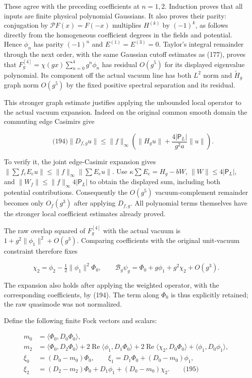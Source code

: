 These agree with the preceding coefficients at \(n=1,2\). Induction
proves that all inputs are finite physical polynomial Gaussians. It also
proves their parity: conjugation by \(\mathcal P F(x)=F(-x)\) multiplies
\(H^{(k)}\) by \((-1)^k\), as follows directly from the homogeneous
coefficient degrees in the fields and potential. Hence \(\phi_n\) has
parity \((-1)^n\) and \(E^{(1)}=E^{(3)}=0\). Taylor's integral remainder
through the next order, with the same Gaussian cutoff estimates as
(177), proves that \(F_g^{[4]}=\chi(gx)\sum_{n=0}^4g^n\phi_n\) has
residual \(O(g^5)\) for its displayed eigenvalue polynomial. Its
component off the actual vacuum line has both \(L^2\) norm and
\(\widetilde H_g\) graph norm \(O(g^5)\) by the fixed positive spectral
separation and its residual.

This stronger graph estimate justifies applying the unbounded local
operator to the actual vacuum expansion. Indeed on the original common
smooth domain the commuting edge Casimirs give

\[
\qquad\text{(194)}
 \|D_{f,g}u\|\le\|f\|_\infty
           \left(\|H_gu\|+\frac{4|\mathsf P_L|}{g^2a}\|u\|\right).
\]

To verify it, the joint edge-Casimir expansion gives
\(\|\sum f_eE_eu\|\le\|f\|_\infty\|\sum E_eu\|\). Use
\(\kappa\sum E_e=H_g-bW\), \(\|W\|\le4|\mathsf P_L|\), and
\(\|W_f\|\le\|f\|_\infty4|\mathsf P_L|\) to obtain the displayed sum,
including both potential contributions. Consequently the \(O(g^5)\)
vacuum-complement remainder becomes only \(O_f(g^3)\) after applying
\(D_{f,g}\). All polynomial terms themselves have the stronger local
coefficient estimates already proved.

The raw overlap squared of \(F_g^{[4]}\) with the actual vacuum is
\(1+g^2\|\phi_1\|^2+O(g^3)\). Comparing coefficients with the original
unit-vacuum constraint therefore fixes

\[
\chi_2=\phi_2-\tfrac12\|\phi_1\|^2\Phi_0,
 \qquad \mathcal B_g\psi_g
       =\Phi_0+g\phi_1+g^2\chi_2+O(g^3).
\]

The expansion also holds after applying the weighted operator, with the
corresponding coefficients, by (194). The term along \(\Phi_0\) is thus
explicitly retained; the raw quasimode was not normalized.

Define the following finite Fock vectors and scalars:

\[
\begin{aligned}
 m_0&=\langle\Phi_0,D_0\Phi_0\rangle,\\
 m_2&=\langle\Phi_0,D_2\Phi_0\rangle
       +2\operatorname{Re}\langle\phi_1,D_1\Phi_0\rangle
       +2\operatorname{Re}\langle\chi_2,D_0\Phi_0\rangle
       +\langle\phi_1,D_0\phi_1\rangle,\\
 \xi_0&=(D_0-m_0)\Phi_0,\qquad
 \xi_1=D_1\Phi_0+(D_0-m_0)\phi_1,\\
 \xi_2&=(D_2-m_2)\Phi_0+D_1\phi_1+(D_0-m_0)\chi_2.
       \qquad\text{(195)}
\end{aligned}
\]

